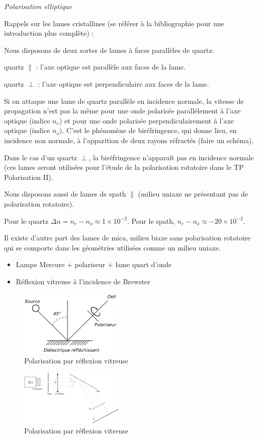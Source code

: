 \documentclass{article}%
\begin{document}
\textit{Polarisation elliptique}

Rappels sur les lames cristallines (se référer à la bibliographie pour une introduction plus complète) :

Nous disposons de deux sortes de lames à faces parallèles de quartz:

quartz $\parallel$ : l'axe optique est parallèle aux faces de la lame.

quartz $\perp$ : l'axe optique est perpendiculaire aux faces de la lame.

Si on attaque une lame de quartz parallèle en incidence normale, la vitesse de propagation n'est pas la même pour une onde polarisée parallèlement à l'axe optique (indice $n_e$) et pour une onde polarisée perpendiculairement à l'axe optique (indice $n_o$). C'est le phénomène de biréfringence, qui donne lieu, en incidence non normale, à l'apparition de deux rayons réfractés (faire un schéma).

Dans le cas d'un quartz $\perp$, la biréfringence n'apparaît pas en incidence normale (ces lames seront utilisées pour l'étude de la polarisation rotatoire dans le TP Polarisation II).

Nous disposons aussi de lames de spath $\parallel$ (milieu uniaxe ne présentant pas de polarisation rotatoire).

Pour le quartz $\Delta n = n_e - n_o \approx 1 \times 10^{- 2}$. Pour le spath, $n_e - n_o \approx -20\times 10^{-2}$.

Il existe d'autre part des lames de mica, milieu biaxe sans polarisation rotatoire qui se comporte dans les géométries utilisées comme un milieu uniaxe.


\begin{itemize}
\item Lampe Mercure + polariseur + lame quart d'onde
\item Réflexion vitreuse à l'incidence de Brewster
\end{itemize}

\begin{figure}
	\centerline{\includegraphics[width=5cm]{images-exp/Polarreflvitrbase.png}}
	\caption{Polarisation par réflexion vitreuse}
\end{figure}
\begin{figure}
	\centerline{\includegraphics[width=5cm]{images-exp/Polarreflvitr.png}}
	\caption{Polarisation par réflexion vitreuse}
\end{figure}
\end{document}
